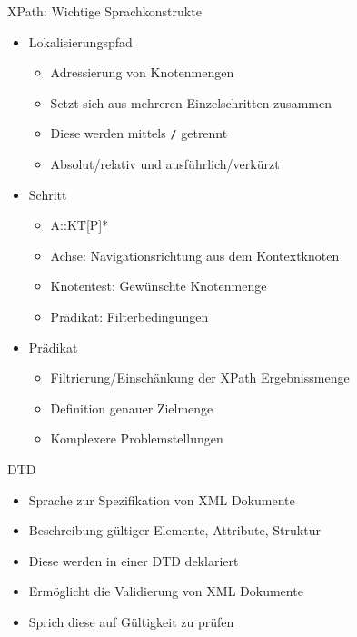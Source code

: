 \documentclass{beamer}
\begin{document}
\begin{frame}{XPath: Wichtige Sprachkonstrukte}
	
	\begin{itemize}
		\item Lokalisierungspfad
		\begin{itemize}
			\item Adressierung von Knotenmengen
			\item Setzt sich aus mehreren Einzelschritten zusammen
			\item Diese werden mittels \texttt{/} getrennt
			\item Absolut/relativ und ausführlich/verkürzt
		\end{itemize}
		\item Schritt
		\begin{itemize}
			\item A::KT[P]*
			\item Achse: Navigationsrichtung aus dem Kontextknoten
			\item Knotentest: Gewünschte Knotenmenge
			\item Prädikat: Filterbedingungen
		\end{itemize}
		\item Prädikat
		\begin{itemize}
			\item Filtrierung/Einschänkung der XPath Ergebnissmenge
			\item Definition genauer Zielmenge
			\item Komplexere Problemstellungen
		\end{itemize}
	\end{itemize}
	
\end{frame}

\begin{frame}{DTD}
	
	\begin{itemize}
		\item Sprache zur Spezifikation von XML Dokumente
		\item Beschreibung gültiger Elemente, Attribute, Struktur
		\item Diese werden in einer DTD deklariert
		\item Ermöglicht die Validierung von XML Dokumente
		\item Sprich diese auf Gültigkeit zu prüfen
	\end{itemize}
	
\end{frame}
\end{document}

